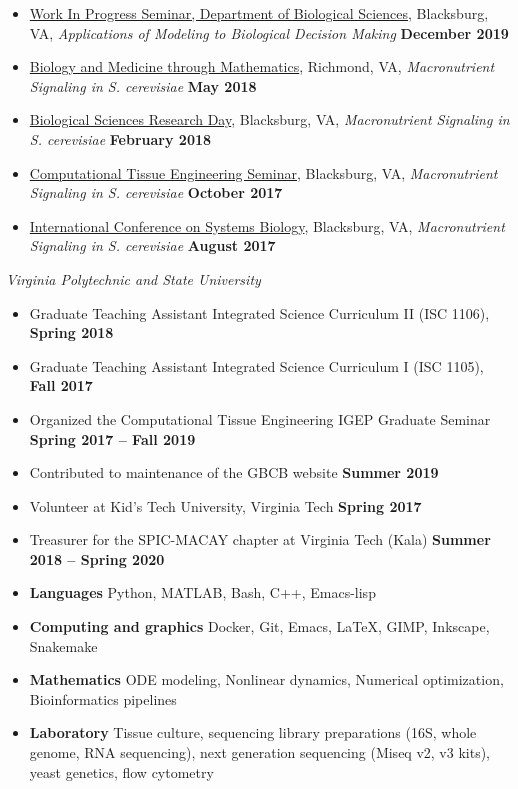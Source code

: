 \begin{itemize}
\item \ul{Work In Progress Seminar, Department of Biological Sciences}, Blacksburg, VA, \textit{Applications of Modeling to Biological Decision Making} \textbf{December 2019}
  \item \ul{Biology and  Medicine through Mathematics}, Richmond, VA, \textit{Macronutrient Signaling in S. cerevisiae} \textbf{May 2018}  
  \item \ul{Biological Sciences Research Day}, Blacksburg, VA, \textit{Macronutrient Signaling in S. cerevisiae} \textbf{February 2018}
  \item \ul{Computational Tissue Engineering Seminar}, Blacksburg, VA, \textit{Macronutrient Signaling in S. cerevisiae} \textbf{October 2017}
  \item \ul{International Conference on Systems Biology}, Blacksburg, VA, \textit{Macronutrient Signaling in S. cerevisiae} \textbf{August 2017}
\end{itemize}

\textit{Virginia Polytechnic and State University}
\begin{itemize}
  \item Graduate Teaching Assistant Integrated Science Curriculum II (ISC 1106), \textbf{Spring 2018}
  \item Graduate Teaching Assistant Integrated Science Curriculum I (ISC 1105), \textbf{Fall 2017}
\end{itemize}

\begin{itemize}
\item Organized the Computational Tissue Engineering IGEP Graduate Seminar \textbf{Spring 2017 -- Fall 2019}  
\item Contributed to maintenance of the GBCB website \textbf{Summer 2019}
\item Volunteer at Kid's Tech University, Virginia Tech \textbf{Spring 2017}    
\item Treasurer for the SPIC-MACAY chapter at Virginia Tech (Kala)  \textbf{Summer 2018 -- Spring 2020}  
\end{itemize}

\begin{itemize}
\item \textbf{Languages} Python, MATLAB,  Bash, C++, Emacs-lisp
\item \textbf{Computing and graphics} Docker, Git, Emacs, \LaTeX, GIMP, Inkscape, Snakemake
\item \textbf{Mathematics} ODE modeling, Nonlinear dynamics, Numerical optimization, Bioinformatics pipelines
\item \textbf{Laboratory} Tissue culture, sequencing library preparations (16S, whole genome, RNA sequencing), next generation sequencing (Miseq v2, v3 kits), yeast genetics, flow cytometry
\end{itemize}


